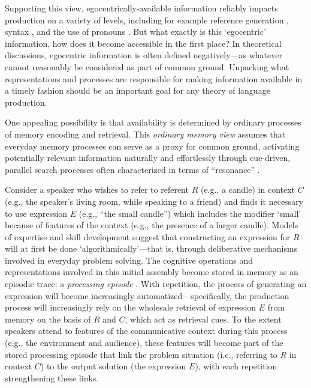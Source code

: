 \documentclass[natbib,man,a4paper]{apa6}
\begin{document}
Supporting this view, egocentrically-available information reliably impacts production on a variety of levels, including for example reference generation \citep{wardlowlanegroismanferreira06}, syntax \citep{ferreiradell00}, and the use of pronouns \citep{FukumuraVanGompel2012}. But what exactly is this `egocentric' information, how does it become accessible in the first place? In theoretical discussions, egocentric information is often defined negatively---as whatever cannot reasonably be considered as part of common ground. Unpacking what representations and processes are responsible for making information available in a timely fashion should be an important goal for any theory of language production.

One appealing possibility is that availability is determined by ordinary processes of memory encoding and retrieval.  This \emph{ordinary memory view} \citep{hortongerrig05} assumes that everyday memory processes can serve as a proxy for common ground, activating potentially relevant information naturally and effortlessly through cue-driven, parallel search processes often characterized in terms of ``resonance'' \citep[e.g.,][]{hintzman86}.  

Consider a speaker who wishes to refer to referent \(R\) (e.g., a candle) in context \(C\) (e.g., the speaker's living room, while speaking to a friend) and finds it necessary to use expression \(E\) (e.g., ``the small candle'') which includes the modifier `small' because of features of the context (e.g., the presence of a larger candle).  Models of expertise and skill development \citep{logan88,loganetherton94} suggest that constructing an expression for \(R\) will at first be done `algorithmically'---that is, through deliberative mechanisms involved in everyday problem solving. The cognitive operations and representations involved in this initial assembly become stored in memory as an episodic trace: a \emph{processing episode} \citep{logan88}. With repetition, the process of generating an expression will become increasingly automatized---specifically, the production process will increasingly rely on the wholesale retrieval of expression \(E\) from memory on the basis of \(R\) and \(C\), which act as retrieval cues. To the extent speakers attend to features of the communicative context during this process (e.g., the environment and audience), these features will become part of the stored processing episode that link the problem situation (i.e., referring to \(R\) in context \(C\)) to the output solution (the expression \(E\)), with each repetition strengthening these links.
\end{document}
